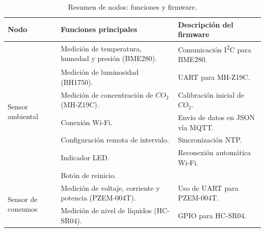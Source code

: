 \begin{table}[H]
    \centering
    \caption[Resumen de nodos]{Resumen de nodos: funciones y firmware.}
    \begin{tabular}{p{1.5cm}p{5.4cm}p{5.5cm}}
        \toprule
        \textbf{Nodo}                                     & \textbf{Funciones principales}                                                 & \textbf{Descripción del firmware}               \\
        \midrule
        \multirow{7}{1.5cm}{Sensor ambiental}             & Medición de temperatura, humedad y presión (BME280).                           & Comunicación I\textsuperscript{2}C para BME280. \\
                                                          & Medición de luminosidad (BH1750).                                              & UART para MH-Z19C.                              \\
                                                          & Medición de concentración de $CO_2$ (MH-Z19C).                                 & Calibración inicial de $CO_2$.                  \\
                                                          & Conexión Wi-Fi.                                                                & Envío de datos en JSON vía MQTT.                \\
                                                          & Configuración remota de intervalo.                                             & Sincronización NTP.                             \\
                                                          & Indicador LED.                                                                 & Reconexión automática Wi-Fi.                    \\
                                                          & Botón de reinicio.                                                             &                                                 \\
        \midrule
        \multirow{6}{1.5cm}{Sensor de consumos}           & Medición de voltaje, corriente y potencia (PZEM-004T).                         & Uso de UART para PZEM-004T.                     \\
                                                          & Medición de nivel de líquidos (HC-SR04).                                       & GPIO para HC-SR04.                              \\

\end{tabular}
\end{table}
